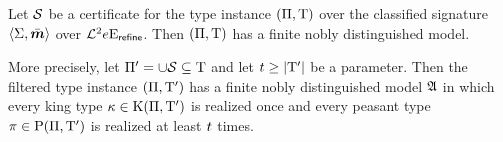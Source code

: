 \begin{lemma}\label{lem:cert-exp-many}
Let $\mathcal{S}$ be a certificate for the type instance $(\Pi,\mathrm{T})$ over the
classified signature $\left\langle \mathrm{\Sigma},\bar{\bm{m}} \right\rangle$ over $\mathcal{L}^{2}{e}\mathrm{E}_{\mathsf{refine}}$. Then
$(\Pi,\mathrm{T})$ has a finite nobly distinguished model.

More precisely, let ${\Pi'} = \cup\mathcal{S} \subseteq \mathrm{T}$ and let $t \geq
\left|{\mathrm{T}'}\right|$ be a parameter. Then the filtered type instance $(\Pi,{\mathrm{T}'})$
has a finite nobly distinguished model $\mathfrak{A}$ in which every king type $\kappa
\in \mathrm{K}(\Pi,{\mathrm{T}'})$ is realized once and every peasant type $\pi \in
\mathrm{P}(\Pi,{\mathrm{T}'})$ is realized at least $t$ times.
\end{lemma}
